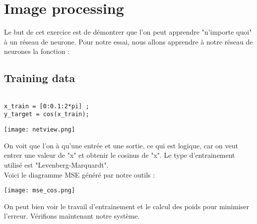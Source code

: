 
\chapter{Image processing} %

\label{Chapitre 4.1} %


Le but de cet exercice est de démontrer que l'on peut apprendre "n'importe quoi" à un réseau de neurone. Pour notre essai, nous allons apprendre à notre réseau de neurones la fonction : 


\section{Training data}


\begin{lstlisting}[frame=single,style=python]  % Start your code-block

x_train = [0:0.1:2*pi] ;
y_target = cos(x_train);
\end{lstlisting}


\begin{center} 
\hspace{15cm}
\texttt{[image: netview.png]}
\end{center}
\vspace{0.5cm} 

On voit que l'on à qu'une entrée et une sortie, ce qui est logique, car on veut entrer une valeur de "x" et obtenir le cosinus de "x". Le type d'entrainement utilisé est "Levenberg-Marquardt".\\

Voici le diagramme MSE généré par notre outils : 

\begin{center} 
\hspace{15cm}
\texttt{[image: mse\_cos.png]}
\end{center}
\vspace{1cm}
On peut bien voir le travail d'entrainement et le calcul des poids pour minimiser l'erreur. Vérifions maintenant notre système.
\pagebreak


